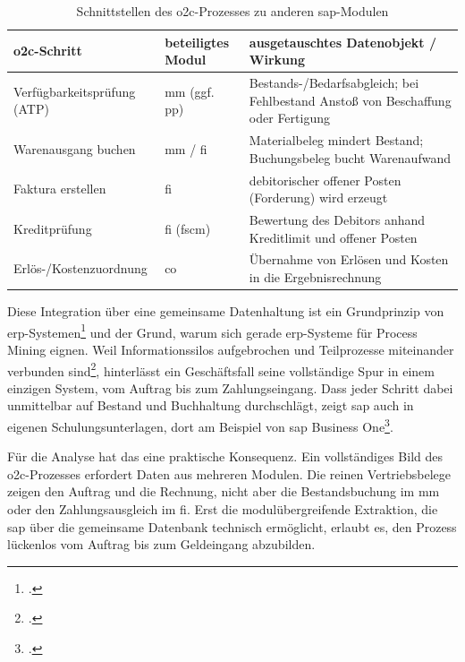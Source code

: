 \begin{table}[!htb]
\centering
\caption{Schnittstellen des \gls{o2c}-Prozesses zu anderen \gls{sap}-Modulen}\label{tab:modulschnittstellen}
\small
\begin{tabularx}{\textwidth}{@{}>{\RaggedRight\arraybackslash}p{3.6cm} >{\RaggedRight\arraybackslash}p{2.8cm} Y@{}}
\toprule
\textbf{\gls{o2c}-Schritt} & \textbf{beteiligtes Modul} & \textbf{ausgetauschtes Datenobjekt /\allowbreak{} Wirkung} \\
\midrule
Verfügbarkeitsprüfung (ATP) & \gls{mm} (ggf. \gls{pp}) & Bestands-/\allowbreak{}Bedarfsabgleich; bei Fehlbestand Anstoß von Beschaffung oder Fertigung \\
Warenausgang buchen & \gls{mm} /\allowbreak{} \gls{fi} & Materialbeleg mindert Bestand; Buchungsbeleg bucht Warenaufwand \\
Faktura erstellen & \gls{fi} & debitorischer offener Posten (Forderung) wird erzeugt \\
Kreditprüfung & \gls{fi} (\gls{fscm}) & Bewertung des Debitors anhand Kreditlimit und offener Posten \\
Erlös-/Kostenzuordnung & \gls{co} & Übernahme von Erlösen und Kosten in die Ergebnisrechnung \\
\bottomrule
\end{tabularx}
\end{table}

Diese Integration über eine gemeinsame Datenhaltung ist ein Grundprinzip von \gls{erp}-Systemen\footcite[Vgl.][S.~4]{gronau2014erp} und der Grund, warum sich gerade \gls{erp}-Systeme für Process Mining eignen. Weil Informationssilos aufgebrochen und Teilprozesse miteinander verbunden sind\footcite[Vgl.][S.~109 f.]{nadukuru2024o2c}, hinterlässt ein Geschäftsfall seine vollständige Spur in einem einzigen System, vom Auftrag bis zum Zahlungseingang. Dass jeder Schritt dabei unmittelbar auf Bestand und Buchhaltung durchschlägt, zeigt \gls{sap} auch in eigenen Schulungsunterlagen, dort am Beispiel von \gls{sap} Business One\footcite[Vgl.][S.~2]{sap2013tb1000}.

Für die Analyse hat das eine praktische Konsequenz. Ein vollständiges Bild des \gls{o2c}-Prozesses erfordert Daten aus mehreren Modulen. Die reinen Vertriebsbelege zeigen den Auftrag und die Rechnung, nicht aber die Bestandsbuchung im \gls{mm} oder den Zahlungsausgleich im \gls{fi}. Erst die modulübergreifende Extraktion, die \gls{sap} über die gemeinsame Datenbank technisch ermöglicht, erlaubt es, den Prozess lückenlos vom Auftrag bis zum Geldeingang abzubilden.

